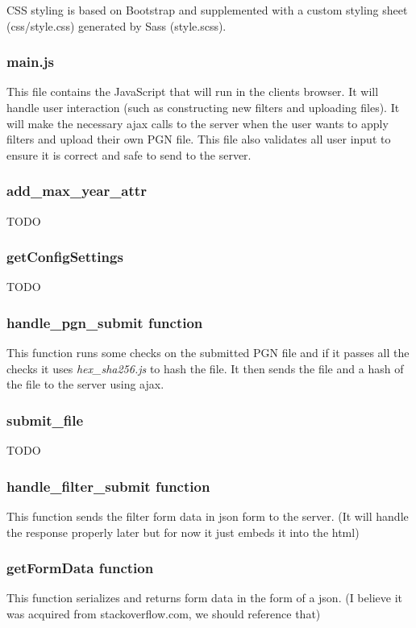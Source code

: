 \documentclass{article}
\begin{document}
CSS styling is based on Bootstrap and supplemented with a custom styling sheet (css/style.css) generated by Sass (style.scss).


\subsubsection{main.js}
This file contains the JavaScript that will run in the clients browser. It will handle user interaction (such as constructing new filters and uploading files). It will make the necessary ajax calls to the server when the user wants to apply filters and upload their own PGN file. This file also validates all user input to ensure it is correct and safe to send to the server.


\subsubsection*{add\_max\_year\_attr}
TODO


\subsubsection*{getConfigSettings}
TODO


\subsubsection*{handle\_pgn\_submit function}
This function runs some checks on the submitted PGN file and if it passes all the checks it uses \textit{hex\_sha256.js} to hash the file. It then sends the file and a hash of the file to the server using ajax.


\subsubsection*{submit\_file}
TODO


\subsubsection*{handle\_filter\_submit function}
This function sends the filter form data in json form to the server. (It will handle the response properly later but for now it just embeds it into the html)


\subsubsection*{getFormData function}
This function serializes and returns form data in the form of a json. (I believe it was acquired from stackoverflow.com, we should reference that)
\end{document}
